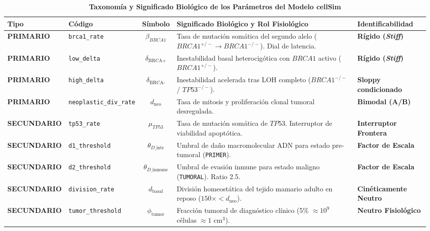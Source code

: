 \documentclass[10pt,a4paper]{article}
\begin{document}
\begin{table}[h!]
\centering
\scriptsize
\caption{\textbf{Taxonomía y Significado Biológico de los Parámetros del Modelo cellSim}}
\begin{tabularx}{\textwidth}{llcXl}
\toprule
\textbf{Tipo} & \textbf{Código} & \textbf{Símbolo} & \textbf{Significado Biológico y Rol Fisiológico} & \textbf{Identificabilidad} \\
\midrule
\textbf{PRIMARIO} & \texttt{brca1\_rate} & $\beta_{BRCA1}$ & Tasa de mutación somática del segundo alelo ($BRCA1^{+/-} \to BRCA1^{-/-}$). Dial de latencia. & \textbf{Rígido (\textit{Stiff})} \\
\textbf{PRIMARIO} & \texttt{low\_delta} & $\delta_{\text{BRCA+}}$ & Inestabilidad basal heterocigótica con $BRCA1$ activo ($BRCA1^{+/-}$). & \textbf{Rígido (\textit{Stiff})} \\
\textbf{PRIMARIO} & \texttt{high\_delta} & $\delta_{\text{BRCA-}}$ & Inestabilidad acelerada tras LOH completo ($BRCA1^{-/-}$ / $TP53^{-/-}$). & \textbf{Sloppy condicionado} \\
\textbf{PRIMARIO} & \texttt{neoplastic\_div\_rate} & $d_{\text{neo}}$ & Tasa de mitosis y proliferación clonal tumoral desregulada. & \textbf{Bimodal (A/B)} \\
\textbf{SECUNDARIO} & \texttt{tp53\_rate} & $\mu_{TP53}$ & Tasa de mutación somática de $TP53$. Interruptor de viabilidad apoptótica. & \textbf{Interruptor Frontera} \\
\textbf{SECUNDARIO} & \texttt{d1\_threshold} & $\theta_{D\text{\_intr}}$ & Umbral de daño macromolecular ADN para estado pre-tumoral (\texttt{PRIMER}). & \textbf{Factor de Escala} \\
\textbf{SECUNDARIO} & \texttt{d2\_threshold} & $\theta_{D\text{\_inmune}}$ & Umbral de evasión inmune para estado maligno (\texttt{TUMORAL}). Ratio 2.5. & \textbf{Factor de Escala} \\
\textbf{SECUNDARIO} & \texttt{division\_rate} & $d_{\text{basal}}$ & División homeostática del tejido mamario adulto en reposo ($150\times < d_{\text{neo}}$). & \textbf{Cinéticamente Neutro} \\
\textbf{SECUNDARIO} & \texttt{tumor\_threshold} & $\phi_{\text{tumor}}$ & Fracción tumoral de diagnóstico clínico (5\% $\approx 10^9$ células $\approx 1\text{ cm}^3$). & \textbf{Neutro Fisiológico} \\
\bottomrule
\end{tabularx}
\label{tab:taxonomia}
\end{table}
\end{document}
